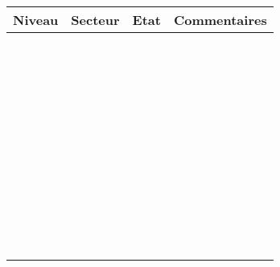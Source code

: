 \documentclass[a4paper]{article}
\begin{document}
\begin{minipage}{5cm}
\renewcommand{\arraystretch}{.8}
\begin{tabular}{|p{1cm}|p{2.2cm}|p{.7cm}|p{3cm}|}
\hline
Niveau & Secteur & Etat \footnotemark & Commentaires \\
\hline
&&&\\
&&&\\
\hline
&&&\\
&&&\\
\hline
&&&\\
&&&\\
\hline
&&&\\
&&&\\
\hline
&&&\\
&&&\\
\hline
&&&\\
&&&\\
\hline
&&&\\
&&&\\
\hline
&&&\\
&&&\\
\hline
&&&\\
&&&\\
\hline
&&&\\
&&&\\
\hline
&&&\\
&&&\\
\hline
&&&\\
&&&\\
\hline
&&&\\
&&&\\
\hline
&&&\\
&&&\\
\hline
&&&\\
&&&\\
\hline
&&&\\
&&&\\
\hline
&&&\\
&&&\\
\hline
&&&\\
&&&\\
\hline
&&&\\
&&&\\
\hline
&&&\\
&&&\\
\hline
&&&\\
&&&\\
\hline
&&&\\
&&&\\
\hline
&&&\\
&&&\\
\hline
&&&\\

\end{tabular}
\end{minipage}
\end{document}
